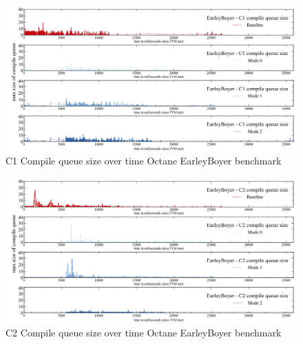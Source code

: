 \begin{figure}[ht]
  \begin{center}
    \centering
    \includegraphics[width=1.0\textwidth]{figures/octane_queue_earleyboyer_separate_c1.png}
    \caption{C1 Compile queue size over time Octane EarleyBoyer benchmark}
    \label{f:octane_queue_earleyboyer_separate_c1}
  \end{center}
\end{figure}
\begin{figure}[ht]
  \begin{center}
    \centering
    \includegraphics[width=1.0\textwidth]{figures/octane_queue_earleyboyer_separate_c2.png}
    \caption{C2 Compile queue size over time Octane EarleyBoyer benchmark}
    \label{f:octane_queue_earleyboyer_separate_c2}
  \end{center}
\end{figure}
